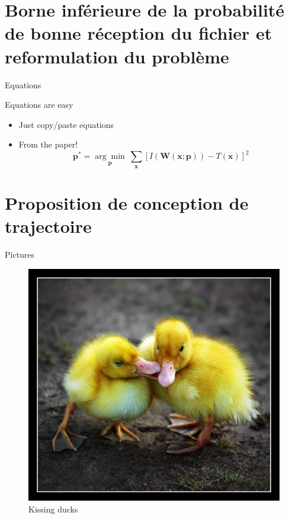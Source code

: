 \documentclass[utf8, a4paper]{beamer}
\begin{document}
\section{Borne inférieure de la probabilité de bonne réception du fichier et reformulation du problème}



\begin{frame}{Equations}

  Equations are easy
  \begin{itemize}
  \item Just copy/paste equations\pause
  \item From the paper!
    \begin{equation*}
      \textbf{p}^* = \underset{\textbf{p}}{\arg\!\min}~\sum_{\textbf{x}}\left[ I(\textbf{W}(\textbf{x};\textbf{p})) - T(\textbf{x}) \right]^2
    \end{equation*}
  \end{itemize}
\end{frame}

\section{Proposition de conception de trajectoire}


\begin{frame}{Pictures}

  \begin{figure}[t]
    \centering
    \includegraphics[height=\dimexpr11\textheight/16\relax]{ducks}
    \caption{Kissing ducks}
  \end{figure}
\end{frame}
\end{document}
